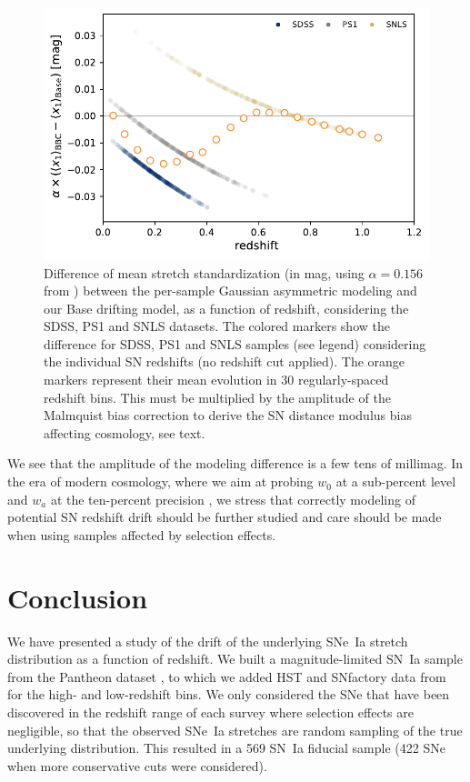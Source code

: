\documentclass[]{aa} %
\newcommand{\mr}[1]{{\textcolor[rgb]{0.60,0.10,0.6}{#1}}}
\begin{document}
\begin{figure}
    \centering
    \includegraphics[width=\linewidth]{Article_figures/BBC_-stretchevol_grouped.pdf}
    \caption{Difference of mean stretch standardization (in mag, using
        $\alpha=0.156$ from \citealt{scolnic2018a}) between the per-sample Gaussian asymmetric modeling
        and our Base drifting model, as a function of redshift, considering the
        SDSS, PS1 and SNLS datasets. The colored markers show the difference for
        SDSS, PS1 and SNLS samples (see legend) considering the individual SN
    redshifts (no redshift cut applied). The orange markers represent their mean
    evolution in 30 regularly-spaced redshift bins. 
    \mr{This must be multiplied by the amplitude of the Malmquist bias correction to derive the SN distance modulus bias affecting cosmology, see text.}}
    \label{fig:magdrift}
\end{figure}

We see that the amplitude of the modeling difference is a few tens of millimag. In the era of modern cosmology, where we aim at probing $w_0$ at a
sub-percent level and $w_a$ at the ten-percent precision
\citep[e.g.,][]{lsstpaper}, we stress that correctly modeling of potential SN redshift drift should be further studied and care should be made when using samples affected by selection effects.

\section{Conclusion}\label{sec:ccl}

We have presented a study of the drift of the \mr{underlying} SNe~Ia stretch distribution as a function of redshift. We
built a magnitude-limited SN~Ia sample from the Pantheon dataset
\citep[][SDSS, PS1 and SNLS]{scolnic2018a}, to which we added HST and SNfactory
data from \cite{rigault2018} for the high- and low-redshift bins. We only
considered the SNe that have been discovered in the redshift range of each
survey where selection effects are negligible, so that the observed SNe~Ia
stretches are random sampling of the true underlying distribution. This
resulted in a 569 SN~Ia fiducial sample (422 SNe when more
conservative cuts were considered).
\end{document}
